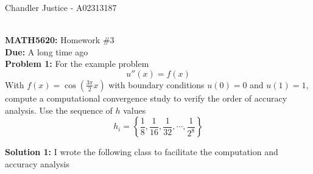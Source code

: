\documentclass[10pt]{article}
\newcommand{\1}{\mathbb{1}}
\begin{document}
\begin{flushright}
Chandler Justice - A02313187
\end{flushright}
\noindent \underline{\hspace{3in}}\\
\textbf{MATH5620:} Homework \#3 \\
\textbf{Due:} A long time ago\\

\textbf{Problem 1:} For the example problem
\[u''(x) = f(x)\]
With $f(x) = \cos\left(\frac{3\pi}{2}x\right)$ with boundary conditions $u(0) = 0$ and $u(1) = 1$, compute a computational convergence study to verify the order of accuracy analysis. Use the sequence of $h$ values
\[h_i = \left\{\frac{1}{8}, \frac{1}{16}, \frac{1}{32}, \cdots, \frac{1}{2^8} \right\}\]

\textbf{Solution 1:} I wrote the following class to facilitate the computation and accuracy analysis
\end{document}

